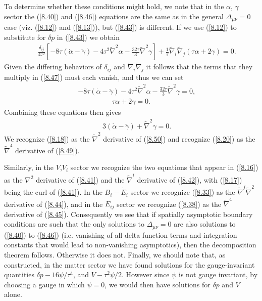 To determine whether these conditions might hold, we note that in the $\alpha$, $\gamma$ sector the (\ref{8.40}) and (\ref{8.46})  equations are the same as in the general $\Delta_{\mu\nu}=0$ case (viz. (\ref{8.12}) and (\ref{8.13})), but (\ref{8.43}) is different. If we use (\ref{8.12}) to substitute for $\delta p$ in (\ref{8.43}) we obtain 
%
\begin{eqnarray}
&&\frac{\delta_{ij}}{4\tau^2}\left[-8\tau(\dot{\alpha}-\ddot{\gamma})-
4\tau^2\tilde{\nabla}^2\alpha-\frac{32\tau}{3} \tilde{\nabla}^2\gamma\right]+\frac{1}{\tau}\tilde{\nabla}_i\tilde{\nabla}_j(\tau\alpha+2\gamma)=0.
\label{8.47}
\end{eqnarray}
%
Given the differing behaviors of $\delta_{ij}$ and $\tilde{\nabla}_i\tilde{\nabla}_j$ it follows that the terms that they multiply  in (\ref{8.47}) must each vanish, and thus we can set
%
\begin{eqnarray}
&&-8\tau(\dot{\alpha}-\ddot{\gamma})-
4\tau^2\tilde{\nabla}^2\alpha-\frac{32\tau}{3} \tilde{\nabla}^2\gamma=0,
\label{8.48}
\end{eqnarray}
%
\begin{eqnarray}
\tau\alpha+2\gamma=0.
\label{8.49}
\end{eqnarray}
%
Combining these equations then gives
%
\begin{eqnarray}
&&3(\dot{\alpha}-\ddot{\gamma})+ \tilde{\nabla}^2\gamma=0.
\label{8.50}
\end{eqnarray}
%
We recognize (\ref{8.18}) as the $\tilde{\nabla}^2$ derivative of (\ref{8.50}) and recognize (\ref{8.20}) as the $\tilde{\nabla}^4$ derivative of (\ref{8.49}).

Similarly, in the $V$,$V_i$ sector we recognize the two equations that appear in (\ref{8.16}) as the $\nabla^2$ derivative of (\ref{8.41}) and the $\tilde{\nabla}^i$ derivative of (\ref{8.42}), with (\ref{8.17}) being the curl of (\ref{8.41}). In the $B_i-\dot{E}_i$ sector we recognize (\ref{8.33}) as the $\tilde{\nabla}^j\tilde{\nabla}^2$ derivative of (\ref{8.44}), and in the $E_{ij}$ sector we recognize (\ref{8.38}) as the $\tilde{\nabla}^4$ derivative of  (\ref{8.45}). Consequently we see that if spatially asymptotic boundary conditions are such that the only solutions to $\Delta_{\mu\nu}=0$ are also solutions to (\ref{8.40}) to (\ref{8.46}) (i.e. vanishing of all delta function terms and integration constants that would lead to non-vanishing asymptotics), then the decomposition theorem follows. Otherwise it does not. Finally, we should note that, as constructed, in the matter sector we have found solutions for the gauge-invariant quantities $\delta p-16\psi/\tau^4$, and $V-\tau^2\psi/2$. However since $\psi$ is not gauge invariant, by choosing a gauge in which $\psi=0$, we would then have solutions for $\delta p$ and $V$ alone.
